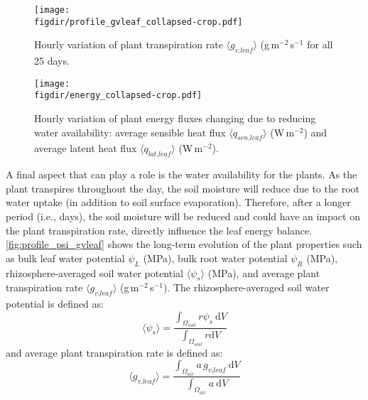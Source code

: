 \begin{figure}[p]
	\centering
	\texttt{[image: \\figdir/profile\_gvleaf\_collapsed-crop.pdf]}
	\caption{Hourly variation of plant transpiration rate $\langle g_{\textit{v,leaf}} \rangle$ (g\,m$^{-2}$\,s$^{-1}$ for all 25 days.}
	\label{fig:profile_gvleaf_collapsed}
\end{figure}

\begin{figure}[p]
	\centering
	\texttt{[image: \\figdir/energy\_collapsed-crop.pdf]}
	\caption{Hourly variation of plant energy fluxes changing due to reducing water availability:  average sensible heat flux $\langle q_{\textit{sen,leaf}} \rangle$ (W\,m$^{-2}$) and  average latent heat flux $\langle q_{\textit{lat,leaf}} \rangle$ (W\,m$^{-2}$). }
	\label{fig:energy_collapsed}
\end{figure}

A final aspect that can play a role is the water availability for the plants. As the plant transpires throughout the day, the soil moisture will reduce due to the root water uptake (in addition to soil surface evaporation). Therefore, after a longer period (i.e., days), the soil moisture will be reduced and could have an impact on the plant transpiration rate, directly influence the leaf energy balance.  \cref{fig:profile_psi_gvleaf} shows the long-term evolution of the plant properties such as bulk leaf water potential $\psi_L$ (MPa), bulk root water potential $\psi_R$ (MPa), rhizosphere-averaged soil water potential $\langle \psi_s \rangle$ (MPa), and average plant transpiration rate $\langle g_{\textit{v,leaf}} \rangle$ (g\,m$^{-2}$\,s$^{-1}$). The rhizosphere-averaged soil water potential is defined as:
\begin{equation}
\langle \psi_s \rangle = \frac{\int_{\Omega_{\textit{soil}}} r \psi_s~\mathrm{d}V}{\int_{\Omega_{\textit{soil}}} r \mathrm{d}V }
\end{equation}
and average plant transpiration rate is defined as:
\begin{equation}
\langle g_{\textit{v,leaf}} \rangle= \frac{\int_{\Omega_{\textit{air}}} a\, g_{\textit{v,leaf}}~\mathrm{d}V}{\int_{\Omega_{\textit{air}}} a~\mathrm{d}V }
\end{equation}

